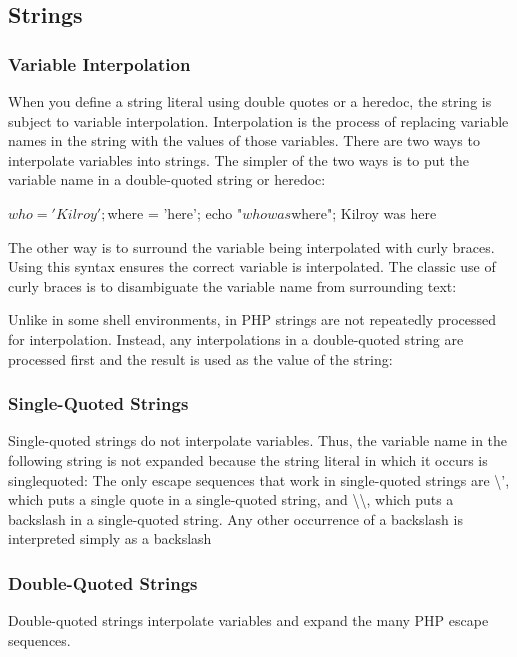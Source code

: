 \documentclass{report}
\begin{document}
\pagebreak 
\subsection{Strings}
\bigbreak \noindent 
\subsubsection{Variable Interpolation}
\bigbreak \noindent 
When you define a string literal using double quotes or a heredoc, the string is subject
to variable interpolation. Interpolation is the process of replacing variable names in the
string with the values of those variables. There are two ways to interpolate variables
into strings.
\bigbreak \noindent 
The simpler of the two ways is to put the variable name in a double-quoted string or heredoc:
\bigbreak \noindent 
\begin{phpcode}
    $who = 'Kilroy';
    $where = 'here';
    echo "$who was $where";
    Kilroy was here
\end{phpcode}
\bigbreak \noindent 
The other way is to surround the variable being interpolated with curly braces. Using
this syntax ensures the correct variable is interpolated. The classic use of curly braces
is to disambiguate the variable name from surrounding text:
\bigbreak \noindent 
{}
\bigbreak \noindent 
Unlike in some shell environments, in PHP strings are not repeatedly processed for
interpolation. Instead, any interpolations in a double-quoted string are processed first
and the result is used as the value of the string:
\bigbreak \noindent 
\subsubsection{Single-Quoted Strings}
\bigbreak \noindent 
Single-quoted strings do not interpolate variables. Thus, the variable name in the following string is not expanded because the string literal in which it occurs is singlequoted:
\bigbreak \noindent 
The only escape sequences that work in single-quoted strings are \textbackslash', which puts a single
quote in a single-quoted string, and \textbackslash\textbackslash, which puts a backslash in a single-quoted string.
Any other occurrence of a backslash is interpreted simply as a backslash
\bigbreak \noindent 
\subsubsection{Double-Quoted Strings}
\bigbreak \noindent 
Double-quoted strings interpolate variables and expand the many PHP escape sequences.
\end{document}
